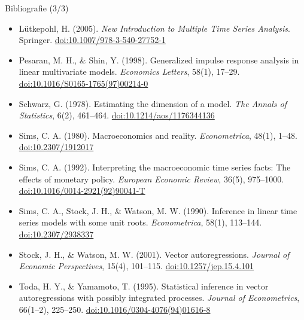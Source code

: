\begin{frame}{Bibliografie (3/3)}
\itemsize{\scriptsize}
\begin{itemize}
    \item Lütkepohl, H. (2005). \textit{New Introduction to Multiple Time Series Analysis}. Springer. \href{https://doi.org/10.1007/978-3-540-27752-1}{doi:10.1007/978-3-540-27752-1}
    \item Pesaran, M. H., \& Shin, Y. (1998). Generalized impulse response analysis in linear multivariate models. \textit{Economics Letters}, 58(1), 17--29. \href{https://doi.org/10.1016/S0165-1765(97)00214-0}{doi:10.1016/S0165-1765(97)00214-0}
    \item Schwarz, G. (1978). Estimating the dimension of a model. \textit{The Annals of Statistics}, 6(2), 461--464. \href{https://doi.org/10.1214/aos/1176344136}{doi:10.1214/aos/1176344136}
    \item Sims, C. A. (1980). Macroeconomics and reality. \textit{Econometrica}, 48(1), 1--48. \href{https://doi.org/10.2307/1912017}{doi:10.2307/1912017}
    \item Sims, C. A. (1992). Interpreting the macroeconomic time series facts: The effects of monetary policy. \textit{European Economic Review}, 36(5), 975--1000. \href{https://doi.org/10.1016/0014-2921(92)90041-T}{doi:10.1016/0014-2921(92)90041-T}
    \item Sims, C. A., Stock, J. H., \& Watson, M. W. (1990). Inference in linear time series models with some unit roots. \textit{Econometrica}, 58(1), 113--144. \href{https://doi.org/10.2307/2938337}{doi:10.2307/2938337}
    \item Stock, J. H., \& Watson, M. W. (2001). Vector autoregressions. \textit{Journal of Economic Perspectives}, 15(4), 101--115. \href{https://doi.org/10.1257/jep.15.4.101}{doi:10.1257/jep.15.4.101}
    \item Toda, H. Y., \& Yamamoto, T. (1995). Statistical inference in vector autoregressions with possibly integrated processes. \textit{Journal of Econometrics}, 66(1--2), 225--250. \href{https://doi.org/10.1016/0304-4076(94)01616-8}{doi:10.1016/0304-4076(94)01616-8}
\end{itemize}
\end{frame}


